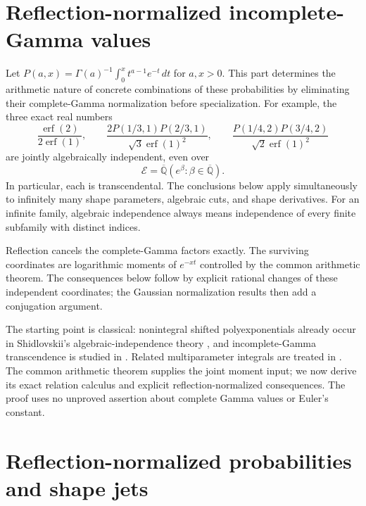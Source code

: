 \documentclass[11pt,a4paper]{article}
\newcommand{\Qbar}{\overline{\mathbb Q}}
\newcommand{\E}{\mathcal E}
\DeclareMathOperator{\erf}{erf}
\theoremstyle{definition}
\theoremstyle{remark}
\numberwithin{equation}{section}
\begin{document}

\section{Reflection-normalized incomplete-Gamma values}

Let $P(a,x)=\Gamma(a)^{-1}\int_0^x t^{a-1}e^{-t}\,dt$ for $a,x>0$.
This part determines the arithmetic nature of concrete combinations of
these probabilities by eliminating their complete-Gamma normalization
before specialization. For example, the three exact real numbers
\begin{equation}\label{refl:eq:opening-three}
 \frac{\erf(2)}{2\erf(1)},\qquad
 \frac{2P(1/3,1)P(2/3,1)}{\sqrt3\erf(1)^2},\qquad
 \frac{P(1/4,2)P(3/4,2)}{\sqrt2\erf(1)^2}
\end{equation}
are jointly algebraically independent, even over
\begin{equation}\label{refl:eq:exp-field}
 \E=\Qbar(e^\beta:\beta\in\Qbar).
\end{equation}
In particular, each is transcendental. The conclusions below apply
simultaneously to infinitely many shape parameters, algebraic cuts, and
shape derivatives. For an infinite family, algebraic independence always
means independence of every finite subfamily with distinct indices.

Reflection cancels the complete-Gamma factors exactly. The surviving
coordinates are logarithmic moments of $e^{-xt}$ controlled by the
common arithmetic theorem. The consequences below follow by explicit
rational changes of these independent coordinates; the Gaussian
normalization results then add a conjugation argument.

The starting point is classical: nonintegral shifted polyexponentials
already occur in Shidlovskii's algebraic-independence theory
\cite{Shidlovskii,Boyadzhiev}, and incomplete-Gamma transcendence is
studied in \cite{MurtySaha}. Related multiparameter integrals are treated
in \cite{GV}. The common arithmetic theorem supplies the joint moment input;
we now derive its exact relation calculus and explicit
reflection-normalized consequences. The proof uses no unproved assertion
about complete Gamma values or Euler's constant.

\section{Reflection-normalized probabilities and shape jets}\label{refl:sec:reflection}
\end{document}
